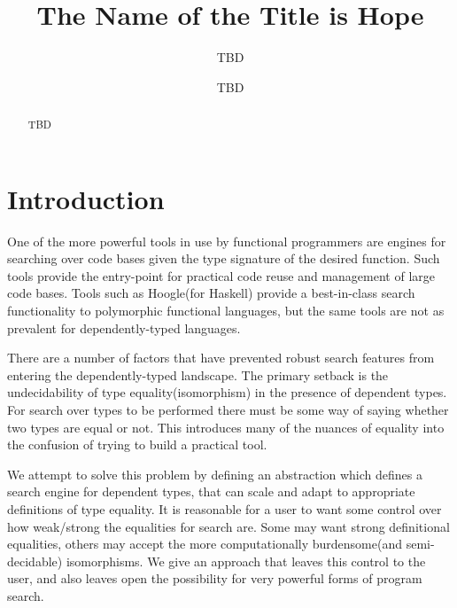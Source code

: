 \documentclass[acmsmall,review,authorversion]{acmart}
\begin{document}
\title{The Name of the Title is Hope}

\author{TBD}
\author{TBD}


\begin{abstract}
  TBD
\end{abstract}

\maketitle

\section{Introduction}

One of the more powerful tools in use by functional programmers are engines for
searching over code bases given the type signature of the desired function. Such
tools provide the entry-point for practical code reuse and management of large
code bases. Tools such as Hoogle(for Haskell) provide a best-in-class search
functionality to polymorphic functional languages, but the same tools are not as
prevalent for dependently-typed languages.

There are a number of factors that have prevented robust search features from
entering the dependently-typed landscape. The primary setback is the
undecidability of type equality(isomorphism) in the presence of dependent types.
For search over types to be performed there must be some way of saying whether
two types are equal or not. This introduces many of the nuances of equality into
the confusion of trying to build a practical tool.

We attempt to solve this problem by defining an abstraction which defines a
search engine for dependent types, that can scale and adapt to appropriate
definitions of type equality. It is reasonable for a user to want some control
over how weak/strong the equalities for search are. Some may want strong
definitional equalities, others may accept the more computationally burdensome(and
semi-decidable) isomorphisms. We give an approach that leaves this control to
the user, and also leaves open the possibility for very powerful forms of
program search.
\end{document}
